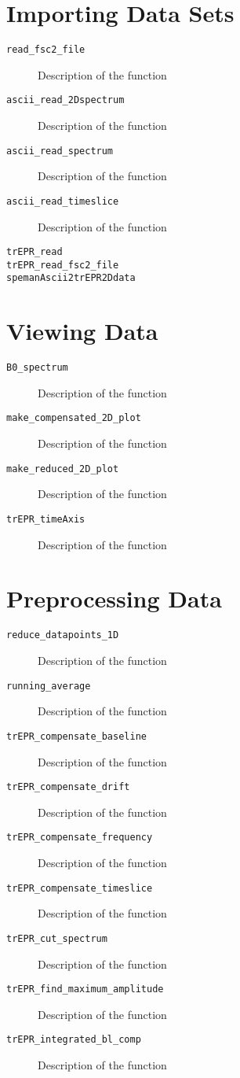 \documentclass[a4paper]{refrep}
\begin{document}
\clearpage


\section{Importing Data Sets}

\begin{description}
  \item[\texttt{read\_fsc2\_file}] Description of the function
  \item[\texttt{ascii\_read\_2Dspectrum}] Description of the function
  \item[\texttt{ascii\_read\_spectrum}] Description of the function
  \item[\texttt{ascii\_read\_timeslice}] Description of the function
  \item[\texttt{trEPR\_read}]
  \item[\texttt{trEPR\_read\_fsc2\_file}]
  \item[\texttt{spemanAscii2trEPR2Ddata}]
\end{description}


\section{Viewing Data}

\begin{description}
  \item[\texttt{B0\_spectrum}] Description of the function
  \item[\texttt{make\_compensated\_2D\_plot}] Description of the function
  \item[\texttt{make\_reduced\_2D\_plot}] Description of the function
  \item[\texttt{trEPR\_timeAxis}] Description of the function
\end{description}


\section{Preprocessing Data}

\begin{description}
  \item[\texttt{reduce\_datapoints\_1D}] Description of the function
  \item[\texttt{running\_average}] Description of the function
  \item[\texttt{trEPR\_compensate\_baseline}] Description of the function
  \item[\texttt{trEPR\_compensate\_drift}] Description of the function
  \item[\texttt{trEPR\_compensate\_frequency}] Description of the function
  \item[\texttt{trEPR\_compensate\_timeslice}] Description of the function
  \item[\texttt{trEPR\_cut\_spectrum}] Description of the function
  \item[\texttt{trEPR\_find\_maximum\_amplitude}] Description of the function
  \item[\texttt{trEPR\_integrated\_bl\_comp}] Description of the function
\end{description}
\end{document}
